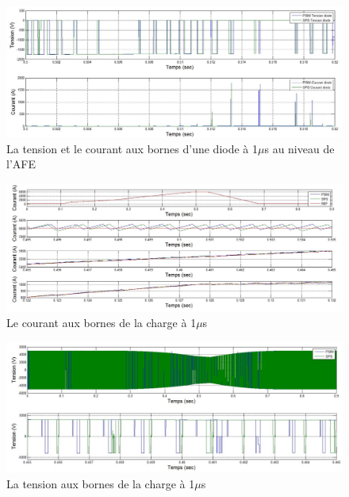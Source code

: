 \documentclass[11pt,letterpaper,final]{report}
\begin{document}
\begin{figure}[htb]
\centering
\includegraphics[scale=0.5]{Fig/DCP_AFE/1u/ten_diode_afe.jpg}
\caption{La tension et le courant aux bornes d'une diode à 1$\mu$s au niveau de l'AFE}
\label{AF_DC_DI1}
\end{figure}


\begin{figure}[htb]
\centering
\includegraphics[scale=0.5]{Fig/DCP_AFE/1u/cour_ch.jpg}
\caption{Le courant aux bornes de la charge à 1$\mu$s}
\label{AF_DC_CHA1}
\end{figure}



\begin{figure}[htb]
\centering
\includegraphics[scale=0.5]{Fig/DCP_AFE/1u/ten_ch.jpg}
\caption{La tension aux bornes de la charge à 1$\mu$s}
\label{AF_DC_CHV1}
\end{figure}
\end{document}
